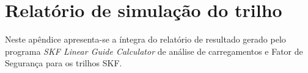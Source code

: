 \section{Relatório de simulação do trilho}\label{append::skf}

Neste apêndice apresenta-se a íntegra do relatório de resultado gerado pelo
programa \textit{SKF Linear Guide Calculator} de análise de carregamentos e 
Fator de Segurança para os trilhos SKF.


